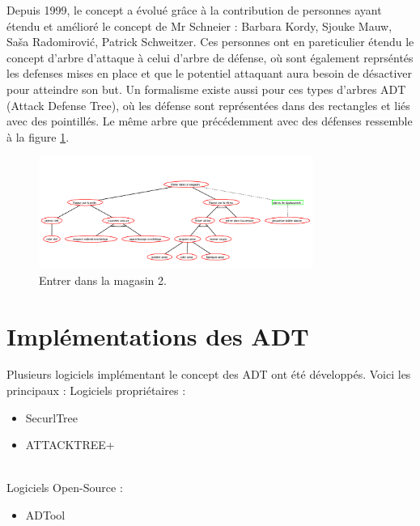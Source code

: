 		Depuis 1999, le concept a évolué grâce à la contribution de personnes ayant étendu et amélioré le concept de Mr Schneier : Barbara Kordy, Sjouke Mauw, Saša Radomirović, Patrick Schweitzer. Ces personnes ont en pareticulier étendu le concept d'arbre d'attaque à celui d'arbre de défense, où sont également reprséntés les defenses mises en place et que le potentiel attaquant aura besoin de désactiver pour atteindre son but. Un formalisme existe aussi pour ces types d'arbres ADT (Attack Defense Tree), où les défense sont représentées dans des rectangles et liés avec des pointillés. Le même arbre que précédemment avec des défenses ressemble à la figure \ref{fig:arbre_exemple_2}.

		\begin{figure}
            \begin{center}
                \includegraphics[width=0.8\textwidth]{figure/Entrer_dans_un_magasin2.png}
            \end{center}
            \caption{Entrer dans la magasin 2.}
            \label{fig:arbre_exemple_2}
		\end{figure}

	\section{Implémentations des ADT}
		Plusieurs logiciels implémentant le concept des ADT ont été développés. Voici les principaux :
		\large Logiciels propriétaires :
		\begin{itemize}
			\item SecurlTree
			\item ATTACKTREE+
		\end{itemize}
		~~\\
		\large Logiciels Open-Source :
		\begin{itemize}
			\item ADTool
		\end{itemize}

